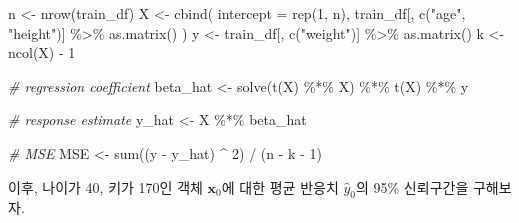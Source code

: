 \documentclass[
]{book}
\newenvironment{Shaded}{\begin{snugshade}}{\end{snugshade}}
\newcommand{\AttributeTok}[1]{\textcolor[rgb]{0.77,0.63,0.00}{#1}}
\newcommand{\CommentTok}[1]{\textcolor[rgb]{0.56,0.35,0.01}{\textit{#1}}}
\newcommand{\DecValTok}[1]{\textcolor[rgb]{0.00,0.00,0.81}{#1}}
\newcommand{\FunctionTok}[1]{\textcolor[rgb]{0.00,0.00,0.00}{#1}}
\newcommand{\NormalTok}[1]{#1}
\newcommand{\OtherTok}[1]{\textcolor[rgb]{0.56,0.35,0.01}{#1}}
\newcommand{\SpecialCharTok}[1]{\textcolor[rgb]{0.00,0.00,0.00}{#1}}
\newcommand{\StringTok}[1]{\textcolor[rgb]{0.31,0.60,0.02}{#1}}
\begin{document}
\begin{Shaded}
\begin{Highlighting}[]
\NormalTok{n }\OtherTok{\textless{}{-}} \FunctionTok{nrow}\NormalTok{(train\_df)}
\NormalTok{X }\OtherTok{\textless{}{-}} \FunctionTok{cbind}\NormalTok{(}
  \AttributeTok{intercept =} \FunctionTok{rep}\NormalTok{(}\DecValTok{1}\NormalTok{, n), }
\NormalTok{  train\_df[, }\FunctionTok{c}\NormalTok{(}\StringTok{"age"}\NormalTok{, }\StringTok{"height"}\NormalTok{)] }\SpecialCharTok{\%\textgreater{}\%} \FunctionTok{as.matrix}\NormalTok{()}
\NormalTok{)}
\NormalTok{y }\OtherTok{\textless{}{-}}\NormalTok{ train\_df[, }\FunctionTok{c}\NormalTok{(}\StringTok{"weight"}\NormalTok{)] }\SpecialCharTok{\%\textgreater{}\%} \FunctionTok{as.matrix}\NormalTok{()}
\NormalTok{k }\OtherTok{\textless{}{-}} \FunctionTok{ncol}\NormalTok{(X) }\SpecialCharTok{{-}} \DecValTok{1}

\CommentTok{\# regression coefficient}
\NormalTok{beta\_hat }\OtherTok{\textless{}{-}} \FunctionTok{solve}\NormalTok{(}\FunctionTok{t}\NormalTok{(X) }\SpecialCharTok{\%*\%}\NormalTok{ X) }\SpecialCharTok{\%*\%} \FunctionTok{t}\NormalTok{(X) }\SpecialCharTok{\%*\%}\NormalTok{ y}

\CommentTok{\# response estimate}
\NormalTok{y\_hat }\OtherTok{\textless{}{-}}\NormalTok{ X }\SpecialCharTok{\%*\%}\NormalTok{ beta\_hat}

\CommentTok{\# MSE}
\NormalTok{MSE }\OtherTok{\textless{}{-}} \FunctionTok{sum}\NormalTok{((y }\SpecialCharTok{{-}}\NormalTok{ y\_hat) }\SpecialCharTok{\^{}} \DecValTok{2}\NormalTok{) }\SpecialCharTok{/}\NormalTok{ (n }\SpecialCharTok{{-}}\NormalTok{ k }\SpecialCharTok{{-}} \DecValTok{1}\NormalTok{)}
\end{Highlighting}
\end{Shaded}

이후, 나이가 40, 키가 170인 객체 \(\mathbf{x}_0\)에 대한 평균 반응치 \(\hat{y}_0\)의 95\% 신뢰구간을 구해보자.
\end{document}
